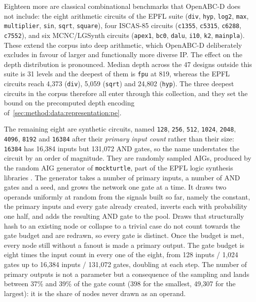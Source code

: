 Eighteen more are classical combinational benchmarks that OpenABC-D does not include: the
eight arithmetic circuits of the EPFL suite \citep{amaru2015epfl} (\texttt{div},
\texttt{hyp}, \texttt{log2}, \texttt{max}, \texttt{multiplier}, \texttt{sin}, \texttt{sqrt},
\texttt{square}), four ISCAS-85 circuits \citep{brglez1985iscas} (\texttt{c1355},
\texttt{c5315}, \texttt{c6288}, \texttt{c7552}), and six MCNC/LGSynth circuits
\citep{yang1991mcnc} (\texttt{apex1}, \texttt{bc0}, \texttt{dalu}, \texttt{i10},
\texttt{k2}, \texttt{mainpla}). These extend the corpus into deep arithmetic, which
OpenABC-D deliberately excludes in favour of larger and functionally more diverse IP. The
effect on the depth distribution is pronounced. Median depth across the 47 designs outside
this suite is 31 levels and the deepest of them is \texttt{fpu} at 819, whereas the EPFL
circuits reach
4{,}373 (\texttt{div}), 5{,}059 (\texttt{sqrt}) and 24{,}802 (\texttt{hyp}). The three
deepest circuits in the corpus therefore all enter through this collection, and they set the
bound on the precomputed depth encoding
of~\ref{sec:method:data:representation:pe}.

The remaining eight are synthetic circuits, named \texttt{128}, \texttt{256}, \texttt{512},
\texttt{1024}, \texttt{2048}, \texttt{4096}, \texttt{8192} and \texttt{16384} after their
\emph{primary input count} rather than their size: \texttt{16384} has 16{,}384 inputs but
131{,}072 AND gates, so the name understates the circuit by an order of magnitude. They are
randomly sampled AIGs, produced by the random AIG generator of \texttt{mockturtle}, part of
the EPFL logic synthesis libraries \citep{soeken2018epfl}. The generator takes a number of
primary inputs, a number of AND gates and a seed, and grows the network one gate at a time.
It draws two operands uniformly at random from the signals built so far, namely the
constant, the primary inputs and every gate already created, inverts each with probability
one half, and adds the resulting AND gate to the pool. Draws that structurally hash to an existing node or
collapse to a trivial case do not count towards the gate budget and are redrawn, so every
gate is distinct. Once the budget is met, every node still without a fanout is made a
primary output. The gate budget is eight times the input count in every one of the eight,
from 128 inputs / 1{,}024 gates up to 16{,}384 inputs / 131{,}072 gates, doubling at each
step. The number of primary outputs is not a parameter but a consequence of
the sampling and lands between 37\% and 39\% of the gate count (398 for the smallest,
49{,}307 for the largest): it is the share of nodes never drawn as an operand.

